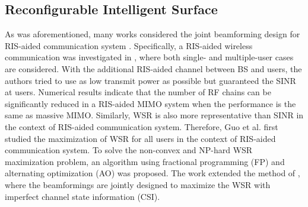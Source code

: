 \subsection{Reconfigurable Intelligent Surface}
As was aforementioned, many works considered the joint beamforming design for RIS-aided communication system \cite{wu2019IRS,guo2019WSR,guo2020ris}.
Specifically, a RIS-aided wireless communication was investigated in \cite{wu2019IRS}, where both single- and multiple-user cases are considered. 
With the additional RIS-aided channel between BS and users, the authors tried to use as low transmit power as possible but guaranteed the SINR at users. 
Numerical results indicate that the number of RF chains can be significantly reduced in a RIS-aided MIMO system 
when the performance is the same as massive MIMO. Similarly, WSR is also more representative than SINR in the context of RIS-aided communication system.
Therefore, Guo et al. \cite{guo2019WSR} first studied the maximization of WSR for all users in the context of RIS-aided communication system.
To solve the non-convex and NP-hard WSR maximization problem, an algorithm using fractional programming (FP) \cite{shen2018fractional,shen2018fractional2} and alternating optimization (AO) was proposed.
The work \cite{guo2020ris} extended the method of \cite{guo2019WSR}, where the beamformings are jointly designed to maximize the WSR with imperfect channel state information (CSI).


